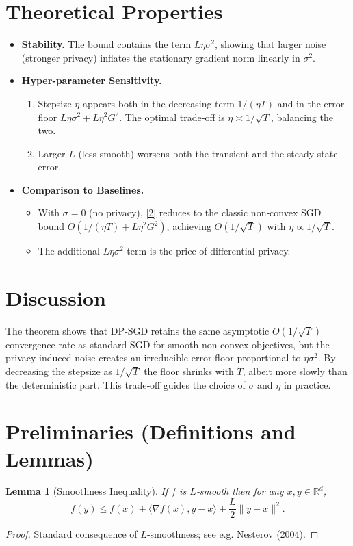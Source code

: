 \documentclass{article}
\newtheorem{lemma}{Lemma}
\newcommand{\R}{\mathbb{R}}
\begin{document}
\section*{Theoretical Properties}
\begin{itemize}[leftmargin=*]
\item \textbf{Stability.} The bound contains the term $L\eta\sigma^{2}$,
showing that larger noise (stronger privacy) inflates the stationary
gradient norm linearly in $\sigma^{2}$.
\item \textbf{Hyper‑parameter Sensitivity.}
  \begin{enumerate}
    \item Stepsize $\eta$ appears both in the decreasing term $1/(\eta T)$ and in the
          error floor $L\eta\sigma^{2}+L\eta^{2}G^{2}$.
          The optimal trade‑off is $\eta\asymp 1/\sqrt{T}$, balancing the two.
    \item Larger $L$ (less smooth) worsens both the transient and the steady‑state
          error.
  \end{enumerate}
\item \textbf{Comparison to Baselines.}
  \begin{itemize}
    \item With $\sigma=0$ (no privacy), \eqref{2} reduces to the classic
          non‑convex SGD bound $O(1/(\eta T)+L\eta^{2}G^{2})$, achieving $O(1/\sqrt{T})$
          with $\eta\propto1/\sqrt{T}$.
    \item The additional $L\eta\sigma^{2}$ term is the price of differential privacy.
  \end{itemize}
\end{itemize}

\section*{Discussion}
The theorem shows that DP‑SGD retains the same asymptotic $O(1/\sqrt{T})$
convergence rate as standard SGD for smooth non‑convex objectives, but the
privacy‑induced noise creates an irreducible error floor proportional to
$\eta\sigma^{2}$. By decreasing the stepsize as $1/\sqrt{T}$ the floor shrinks
with $T$, albeit more slowly than the deterministic part. This trade‑off
guides the choice of $\sigma$ and $\eta$ in practice.

\newpage
\section*{Preliminaries (Definitions and Lemmas)}
\begin{lemma}[Smoothness Inequality]\label{lem:smooth}
If $f$ is $L$‑smooth then for any $x,y\in\R^{d}$,
\[
f(y)\le f(x)+\langle\nabla f(x),y-x\rangle+\frac{L}{2}\|y-x\|^{2}.
\tag{L1}
\]
\end{lemma}
\begin{proof}
Standard consequence of $L$‑smoothness; see e.g. Nesterov (2004). \qedhere
\end{proof}
\end{document}
